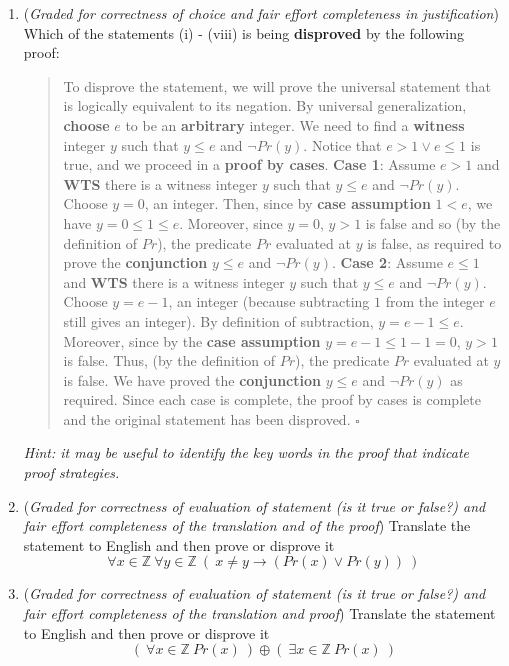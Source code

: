 \begin{enumerate}
\begin{enumerate}
   \item ({\it Graded for correctness of choice and fair effort completeness in justification}) 
   Which of the statements (i) - (viii) is being {\bf disproved} by the following proof:
   \begin{quote}
     To disprove the statement, we will prove the universal
     statement that is logically equivalent to its negation. 
     By universal generalization, {\bf choose} $e$ to be an {\bf arbitrary} integer. 
     We need to find a {\bf witness} integer $y$ such that $y \leq e$ and $\lnot Pr(y)$.
     Notice that $e > 1 \lor e \leq 1$ is true, and we proceed in a {\bf proof by cases}.
     {\bf Case 1}: Assume $e > 1$ and {\bf WTS} there is a witness integer $y$ such that
     $y \leq e$ and $\lnot Pr(y)$. Choose $y = 0$, an integer. Then, since by {\bf case assumption}
     $1 < e$, we have $y = 0 \leq 1 \leq e$.
     Moreover, since $y = 0$, $y > 1$ is false and so (by the definition of $Pr$), the predicate $Pr$
     evaluated at $y$ is false, as required to prove the {\bf conjunction} $y \leq e$ and $\lnot Pr(y)$. 
     {\bf Case 2}: 
     Assume $e \leq 1$ and {\bf WTS} there is a witness integer $y$ such that
     $y \leq e$ and $\lnot Pr(y)$. Choose $y = e-1$, an integer (because subtracting
     $1$ from the integer $e$ still gives an integer). By definition of subtraction, $y = e-1 \leq e$.
     Moreover, since by the {\bf case assumption} $y = e-1 \leq 1-1= 0$, $y > 1$ is false. Thus, 
    (by the definition of $Pr$), the predicate $Pr$
     evaluated at $y$ is false. We have proved the {\bf conjunction} $y \leq e$ and $\lnot Pr(y)$ as required.
     Since each case is complete, the proof by cases is complete and the original
     statement has been disproved.  $\square$
   \end{quote}
   
   {\it Hint: it may be useful to 
   identify the key words in the proof that indicate proof strategies.}

   \item ({\it Graded for correctness of evaluation of statement (is it true or false?)
   and fair effort completeness of the translation and of the proof}) 
    Translate the statement to English and then prove or disprove it
   $$\forall x \in \mathbb{Z}~ \forall y \in \mathbb{Z}~(~x \neq y \to (Pr(x) \lor Pr(y))~)$$

   \item ({\it Graded for correctness of evaluation of statement (is it true or false?) 
   and fair effort completeness of the translation and proof}) 
   Translate the statement to English and then prove or disprove it
   $$\left( ~\forall x \in \mathbb{Z} ~Pr(x)~\right) \oplus \left(~\exists x \in \mathbb{Z} ~Pr(x) ~\right)$$


\end{enumerate}
\end{enumerate}
